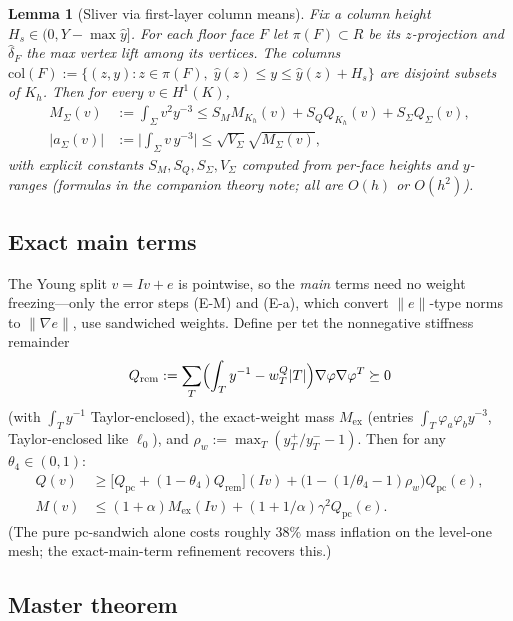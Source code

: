 \documentclass[11pt]{amsart}
\newtheorem{lemma}[theorem]{Lemma}
\begin{document}
\begin{lemma}[Sliver via first-layer column means]\label{lem:S}
Fix a column height $H_s\in(0,Y-\max\hat y]$.  For each floor face $F$
let $\pi(F)\subset R$ be its $z$-projection and $\hat\delta_F$ the max
vertex lift among its vertices.  The columns
$\mathrm{col}(F):=\{(z,y):z\in\pi(F),\;\hat y(z)\le y\le\hat y(z)+H_s\}$
are disjoint subsets of $K_h$.  Then for every $v\in H^1(K)$,
\begin{align*}
  M_\Sigma(v)&:=\int_\Sigma v^2 y^{-3}
  \le S_M M_{K_h}(v)+S_Q Q_{K_h}(v)+S_\Sigma Q_\Sigma(v),\\
  |a_\Sigma(v)|&:=\bigl|\int_\Sigma v\,y^{-3}\bigr|
  \le\sqrt{V_\Sigma}\sqrt{M_\Sigma(v)},
\end{align*}
with explicit constants $S_M,S_Q,S_\Sigma,V_\Sigma$ computed from per-face
heights and $y$-ranges (formulas in the companion theory note; all are
$O(h)$ or $O(h^2)$).
\end{lemma}

\subsection{Exact main terms}

The Young split $v=Iv+e$ is pointwise, so the \emph{main} terms need no
weight freezing---only the error steps (E-M) and (E-a), which convert
$\|e\|$-type norms to $\|\nabla e\|$, use sandwiched weights.  Define per
tet the nonnegative stiffness remainder
\[
  Q_{\mathrm{rem}}:=\sum_T\Bigl(\int_T y^{-1}-w_T^Q|T|\Bigr)\nabla\varphi\nabla\varphi^T
  \succeq 0
\]
(with $\int_T y^{-1}$ Taylor-enclosed), the exact-weight mass $M_{\mathrm{ex}}$
(entries $\int_T\varphi_a\varphi_b y^{-3}$, Taylor-enclosed like $\ell_0$),
and $\rho_w:=\max_T(y_T^+/y_T^--1)$.  Then for any $\theta_4\in(0,1)$:
\begin{align*}
  Q(v)&\ge\bigl[Q_{\mathrm{pc}}+(1-\theta_4)Q_{\mathrm{rem}}\bigr](Iv)
    +\bigl(1-(1/\theta_4-1)\rho_w\bigr)Q_{\mathrm{pc}}(e),\\
  M(v)&\le(1+\alpha)M_{\mathrm{ex}}(Iv)+(1+1/\alpha)\gamma^2 Q_{\mathrm{pc}}(e).
\end{align*}
(The pure pc-sandwich alone costs roughly $38\%$ mass inflation on the
level-one mesh; the exact-main-term refinement recovers this.)

\subsection{Master theorem}
\end{document}
